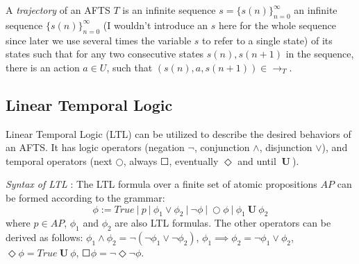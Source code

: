 A \emph{trajectory} of an AFTS $T$ is an infinite sequence $ s = \{s(n)\}_{n=0}^{\infty} $ 
{\color{purple} an infinite sequence $\{s(n)\}_{n=0}^{\infty}$ (I wouldn't introduce an $s$ here for the whole sequence since later we use several times the variable $s$ to refer to a single state)}
of its states such that for any two consecutive states $s(n), s(n+1)$ in the sequence, there is an action $a\in U$, such that $(s(n),a,s(n+1))\in \rightarrow_T$. 

\subsection{Linear Temporal Logic}

Linear Temporal Logic (LTL) can be utilized to describe the desired behaviors of an AFTS. It has logic operators (negation $ \neg $, conjunction $ \wedge $, disjunction $ \vee $), and temporal operators (next $ \bigcirc $, always $ \Square $, eventually $ \Diamond $ and until $ \mathbf{\ U\ }$).


{\color{teal}\emph{ Syntax of LTL} \cite{baier2008principles}: The LTL formula over a finite set of atomic propositions $ AP $ can be formed according to the grammar:}
\begin{displaymath}
	\phi := True\ \vert\ p\ \vert\ \phi_1 \vee \phi_2\ \vert\ \neg \phi\ \vert\ \bigcirc \phi\ \vert\ \phi_1 \mathbf{\ U\ }\phi_2
\end{displaymath}
where $ p\in AP $, $ \phi_1 $ and $ \phi_2 $ are also LTL formulas. The other operators can be derived as follows: $ \phi_1 \wedge \phi_2 = \neg (\neg \phi_1 \vee \neg \phi_2) $, $ \phi_1 \implies \phi_2 = \neg \phi_1 \vee \phi_2 $, $ \Diamond \phi = True \mathbf{\ U\ } \phi $, $ \Square \phi = \neg \Diamond \neg \phi $.

